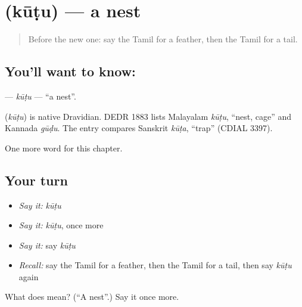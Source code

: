 \section[\texorpdfstring{\ta{கூடு} (kūṭu)}{கூடு (kūṭu)}]{ (kūṭu) — a nest}

\label{lesson:TA-C275-kutu}



\begin{quote}
Before the new one: say the Tamil for a feather, then the Tamil for a tail.
\end{quote}

\subsection*{You'll want to know: }
\textbf{} — \emph{kūṭu} — \textquotedblleft{}a nest\textquotedblright{}.

\begin{cousinweb}
\textbf{} (\emph{kūṭu}) is native Dravidian. DEDR 1883 lists Malayalam \emph{kūṭu}, \textquotedblleft{}nest, cage\textquotedblright{} and Kannada \emph{gūḍu}. The entry compares Sanskrit \emph{kūṭa}, \textquotedblleft{}trap\textquotedblright{} (CDIAL 3397).
\end{cousinweb}

\begin{grammarlens}[title={What you've built}]
One more word for this chapter.
\end{grammarlens}

\subsection*{Your turn}
\begin{itemize}
\raggedright
  \item \emph{Say it:} \emph{kūṭu}
  \item \emph{Say it:} \emph{kūṭu}, once more
  \item \emph{Say it:} say \emph{kūṭu}
  \item \emph{Recall:} say the Tamil for a feather, then the Tamil for a tail, then say \emph{kūṭu} again
\end{itemize}

\begin{tcolorbox}[breakable,colback=teal!4,colframe=teal!35!black,title={Before you move on}]
What does  mean? (\textquotedblleft{}A nest\textquotedblright{}.) Say it once more.
\end{tcolorbox}
